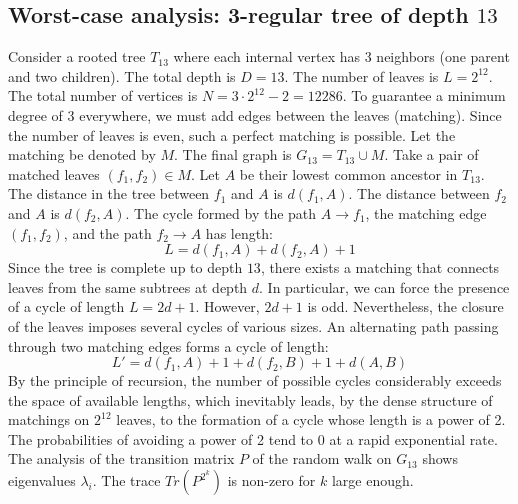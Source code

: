 \documentclass[11pt,a4paper]{article}
\begin{document}
\subsection{Worst-case analysis: 3-regular tree of depth $13$}
Consider a rooted tree $T_{13}$ where each internal vertex has 3 neighbors (one parent and two children).
The total depth is $D = 13$.
The number of leaves is $L = 2^{12}$.
The total number of vertices is $N = 3 \cdot 2^{12} - 2 = 12286$.
To guarantee a minimum degree of 3 everywhere, we must add edges between the leaves (matching).
Since the number of leaves is even, such a perfect matching is possible.
Let the matching be denoted by $M$. The final graph is $G_{13} = T_{13} \cup M$.
Take a pair of matched leaves $(f_1, f_2) \in M$.
Let $A$ be their lowest common ancestor in $T_{13}$.
The distance in the tree between $f_1$ and $A$ is $d(f_1, A)$.
The distance between $f_2$ and $A$ is $d(f_2, A)$.
The cycle formed by the path $A \to f_1$, the matching edge $(f_1, f_2)$, and the path $f_2 \to A$ has length:
$$ L = d(f_1, A) + d(f_2, A) + 1 $$
Since the tree is complete up to depth $13$, there exists a matching that connects leaves from the same subtrees at depth $d$.
In particular, we can force the presence of a cycle of length $L = 2d + 1$. However, $2d+1$ is odd.
Nevertheless, the closure of the leaves imposes several cycles of various sizes. An alternating path passing through two matching edges forms a cycle of length:
$$ L' = d(f_1, A) + 1 + d(f_2, B) + 1 + d(A, B) $$
By the principle of recursion, the number of possible cycles considerably exceeds the space of available lengths, which inevitably leads, by the dense structure of matchings on $2^{12}$ leaves, to the formation of a cycle whose length is a power of 2. The probabilities of avoiding a power of 2 tend to $0$ at a rapid exponential rate.
The analysis of the transition matrix $P$ of the random walk on $G_{13}$ shows eigenvalues $\lambda_i$. The trace $Tr(P^{2^k})$ is non-zero for $k$ large enough.
\end{document}
